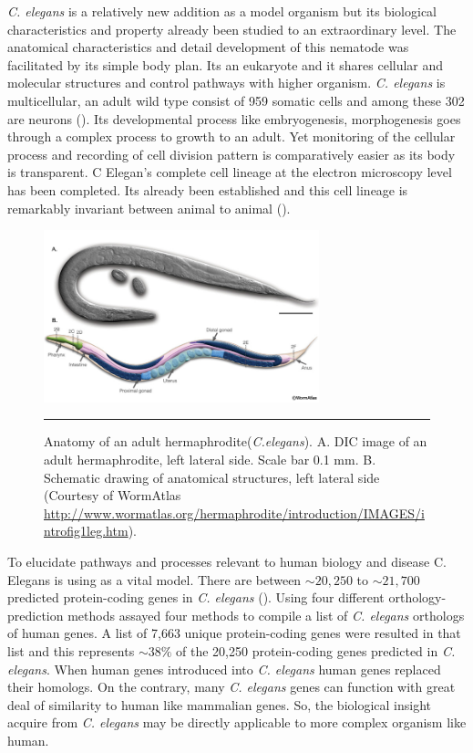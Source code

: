 \textit{C. elegans} is a relatively new addition as a model organism but its biological characteristics 
and property already been studied to an extraordinary level. The anatomical characteristics and 
detail development of this nematode was facilitated by its simple body plan. Its an eukaryote and
it shares cellular and molecular structures and control pathways with higher organism. \textit{C. elegans}
is multicellular, an adult wild type  consist of 959 somatic cells and among these 302 are neurons
(\cite{Sulston:1977, Palikaras:2013}). Its developmental process like embryogenesis, morphogenesis 
goes through a complex process to growth to an adult. Yet monitoring of the cellular process 
and recording of cell division pattern is comparatively easier as its body is transparent. 
C Elegan's complete cell lineage at the electron microscopy level has been completed. 
Its already been established and this cell lineage is remarkably invariant between animal to
animal (\cite{Brenner:1974, Byerly:1976, Sulston:1980, Wood:1988}).

\begin{figure}[htbp]
	\centering
		\includegraphics[width=8cm,keepaspectratio]{diagrams/introfig1lr.jpg}
		\rule{35em}{0.5pt}
	\caption[Anatomy of an adult]{Anatomy of an adult hermaphrodite(\textit{C.elegans}). 
	A. DIC image of an adult hermaphrodite, left lateral side. Scale bar 0.1 mm. 
	B. Schematic drawing of anatomical structures, left lateral side 
	(Courtesy of WormAtlas \url{http://www.wormatlas.org/hermaphrodite/introduction/IMAGES/introfig1leg.htm}).}
	\label{fig:anatomy}
\end{figure}

To elucidate pathways and processes relevant to human biology 
and disease C. Elegans is using as a vital model. There are between $\sim20,250$ to $\sim21,700$ 
predicted protein-coding genes in \textit{C. elegans} (\cite{Gerstein:2010}).
Using four different orthology-prediction methods \cite{Daniel:2011} assayed four methods 
to compile a list of \textit{C. elegans} orthologs of human genes. 
A  list of 7,663 unique protein-coding genes were resulted in that list and this
represents $\sim38\%$ of the 20,250 protein-coding genes predicted in \textit{C. elegans}. When human genes 
introduced into \textit{C. elegans} human genes replaced their homologs. On the contrary, many \textit{C. elegans}
genes can function with great deal of similarity to human like mammalian genes. So, 
the biological insight acquire from \textit{C. elegans} may be directly applicable to more 
complex organism like human.

